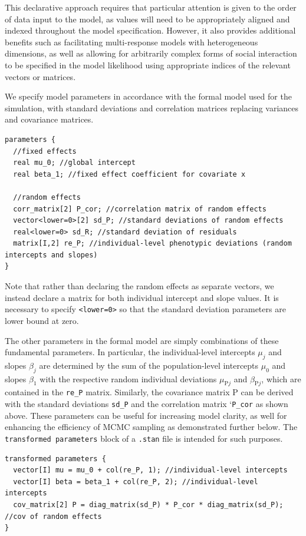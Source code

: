 \documentclass[
]{book}
\begin{document}
This declarative approach requires that particular attention is given to the order of data input to the model, as values will need to be appropriately aligned and indexed throughout the model specification. However, it also provides additional benefits such as facilitating multi-response models with heterogeneous dimensions, as well as allowing for arbitrarily complex forms of social interaction to be specified in the model likelihood using appropriate indices of the relevant vectors or matrices.

We specify model parameters in accordance with the formal model used for the simulation, with standard deviations and correlation matrices replacing variances and covariance matrices.

\begin{verbatim}
parameters {
  //fixed effects
  real mu_0; //global intercept
  real beta_1; //fixed effect coefficient for covariate x

  //random effects
  corr_matrix[2] P_cor; //correlation matrix of random effects 
  vector<lower=0>[2] sd_P; //standard deviations of random effects
  real<lower=0> sd_R; //standard deviation of residuals
  matrix[I,2] re_P; //individual-level phenotypic deviations (random intercepts and slopes)
}
\end{verbatim}

Note that rather than declaring the random effects as separate vectors, we instead declare a matrix for both individual intercept and slope values. It is necessary to specify \texttt{\textless{}lower=0\textgreater{}} so that the standard deviation parameters are lower bound at zero.

The other parameters in the formal model are simply combinations of these fundamental parameters. In particular, the individual-level intercepts \(\mu_j\) and slopes \(\beta_j\) are determined by the sum of the population-level intercepts \(\mu_0\) and slopes \(\beta_1\) with the respective random individual deviations \(\mu_{\mathrm{P}j}\) and \(\beta_{\mathrm{P}j}\), which are contained in the \texttt{re\_P} matrix. Similarly, the covariance matrix \(\boldsymbol{\mathrm{P}}\) can be derived with the standard deviations \texttt{sd\_P} and the correlation matrix `\texttt{P\_cor} as shown above. These parameters can be useful for increasing model clarity, as well for enhancing the efficiency of MCMC sampling as demonstrated further below. The \texttt{transformed\ parameters} block of a \texttt{.stan} file is intended for such purposes.

\begin{verbatim}
transformed parameters {
  vector[I] mu = mu_0 + col(re_P, 1); //individual-level intercepts
  vector[I] beta = beta_1 + col(re_P, 2); //individual-level intercepts
  cov_matrix[2] P = diag_matrix(sd_P) * P_cor * diag_matrix(sd_P); //cov of random effects
}
\end{verbatim}
\end{document}
